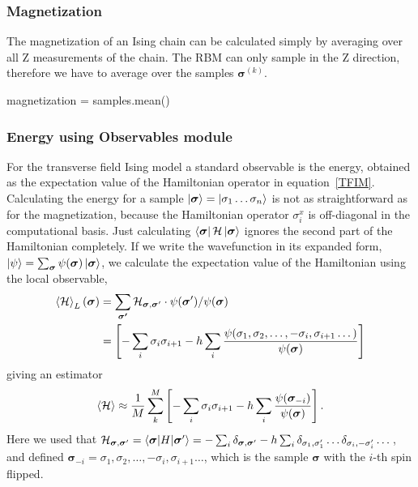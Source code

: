 \documentclass[submission, Phys]{SciPost}
\begin{document}
\subsubsection{Magnetization}

The magnetization of an Ising chain can be calculated simply by averaging over all Z measurements of the chain.
The RBM can only sample in the Z direction, therefore we have to average over the samples $\bm{\sigma}^{(k)}$.

\begin{python}
	magnetization = samples.mean()
\end{python}

\subsubsection{Energy using Observables module}

For the transverse field Ising model a standard observable is the energy, obtained as the expectation value of
the Hamiltonian operator in equation~\ref{TFIM}.
Calculating the energy for a sample $\ket{\bm{\sigma} }= \ket{\sigma_1 \dots \sigma_n}$ is not as straightforward as for the magnetization,
because the Hamiltonian operator ${\sigma}^x_i$ is off-diagonal in the computational basis.
Just calculating $\bra{\bm{\sigma} } \mathcal{H} \ket{\bm{\sigma} }$ ignores the second part of the Hamiltonian completely.
If we write the wavefunction in its expanded form, $\ket{\psi} = \sum_{\bm{\sigma}} \psi(\bm{\sigma}) \ket{\bm{\sigma}} $,
we calculate the expectation value of the Hamiltonian using the local observable,
\begin{align}
	\braket{ \mathcal{H}}_L({\bm{\sigma}}) & = \sum_{ \bm{\sigma'}} \mathcal{H}_{\bm{\sigma}, \bm{\sigma}'} \cdot \psi(\bm{\sigma}') / \psi(\bm{\sigma})                                                     \\
	                             & =  \left[ -\sum_i \sigma_i \sigma_{i+1} - h \sum_i \frac{\psi(\sigma_1, \sigma_2, \dots , -\sigma_i, \sigma_{i+1} \dots)}{\psi (\bm{\sigma})} \right]
\end{align}
giving an estimator
\begin{equation}
	\braket{ \mathcal{H}} \approx \frac{1}{M} \sum_k^M \left[ -\sum_i \sigma_i \sigma_{i+1} - h \sum_i \frac{\psi (\bm{\sigma}_{-i})}{\psi (\bm{\sigma})} \right].
\end{equation}
Here we used that $\mathcal{H}_{\bm{\sigma}, \bm{\sigma}'} = \braket{\bm{\sigma} | H | \bm{\sigma}'} = -\sum_i \delta_{\bm{\sigma}, \bm{\sigma}'} - h \sum_i \delta_{\sigma_1, \sigma_1'} \dots \delta_{\sigma_i, -\sigma_i'} \dots$, and defined $\bm{\sigma}_{-i} = \sigma_1, \sigma_2, \dots , -\sigma_i, \sigma_{i+1} \dots$, which is the sample $\bm{\sigma}$ with the $i$-th spin flipped.
\end{document}
